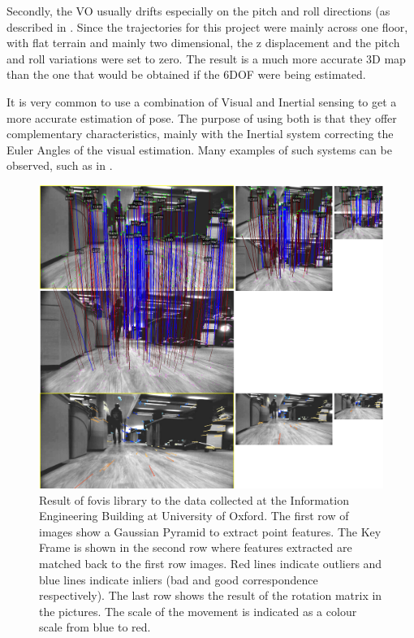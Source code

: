 \documentclass[12pt]{article}
\begin{document}
Secondly, the VO usually drifts especially on the pitch and roll directions (as described in \cite{usenko2016direct}. Since the trajectories for this project were mainly across one floor, with flat terrain and mainly two dimensional, the z displacement and the pitch and roll variations were set to zero. The result is a much more accurate 3D map than the one that would be obtained if the 6DOF were being estimated.
	
It is very common to use a combination of Visual and Inertial sensing to get a more accurate estimation of pose. The purpose of using both is that they offer complementary characteristics, mainly with the Inertial system correcting the Euler Angles of the visual estimation. Many examples of such systems can be observed, such as in \cite{usenko2016direct}.
	
\begin{figure}
\begin{minipage}{0.65\textwidth}
\centering
\includegraphics[width=\textwidth]{VisualOdometry1}
\end{minipage} \hfill
\begin{minipage}{0.35\textwidth}
\centering
\caption[t]{Result of fovis library to the data collected at the Information Engineering Building at University of Oxford. The first row of images show a Gaussian Pyramid to extract point features. The Key Frame is shown in the second row where features extracted are matched back to the first row images. Red lines indicate outliers and blue lines indicate inliers (bad and good correspondence respectively). The last row shows the result of the rotation matrix in the pictures. The scale of the movement is indicated as a colour scale from blue to red.}
\label{fig:VisualOdometry1}	
\end{minipage}				
\end{figure}
		
\end{document}
